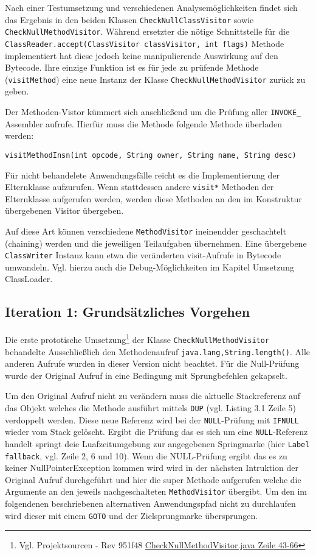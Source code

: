 Nach einer Testumsetzung und verschiedenen Analysemöglichkeiten findet sich
das Ergebnis in den beiden Klassen \texttt{CheckNullClassVisitor} sowie
\texttt{CheckNullMethodVisitor}. Während ersetzter die nötige Schnittstelle für die
\texttt{ClassReader.accept(ClassVisitor classVisitor, int flags)} Methode implementiert
hat diese jedoch keine manipulierende Auswirkung auf den Bytecode. Ihre
einzige Funktion ist es für jede zu prüfende Methode (\texttt{visitMethod})
eine neue Instanz der Klasse \texttt{CheckNullMethodVisitor} zurück zu geben.

Der Methoden-Vistor kümmert sich anschließend um die Prüfung aller \texttt{INVOKE\_\*}
Assembler aufrufe. Hierfür muss die Methode folgende Methode überladen werden:

\texttt{visitMethodInsn(int opcode, String owner, String name, String desc)}

Für nicht behandelete Anwendungsfälle reicht es die Implementierung der Elternklasse
aufzurufen. Wenn stattdessen andere \texttt{visit*} Methoden der Elternklasse aufgerufen
werden, werden diese Methoden an den im Konstruktur übergebenen Visitor übergeben.

Auf diese Art können verschiedene \texttt{MethodVisitor} ineinendder geschachtelt
(chaining) werden und die jeweiligen Teilaufgaben übernehmen. Eine übergebene \texttt{ClassWriter}
Instanz kann etwa die veränderten visit-Aufrufe in Bytecode umwandeln. Vgl. hierzu
auch die Debug-Möglichkeiten im Kapitel Umsetzung ClassLoader.

\subsection{Iteration 1: Grundsätzliches Vorgehen}

Die erste prototische Umsetzung\footnote{Vgl. Projektsourcen - Rev 951f48 \href{https://github.com/jerolimov/java-hardener/blob/951f48194f53baebd0915c01e0ed3cc2596bd0db/src/main/java/de/fhkoeln/gm/cui/javahardener/CheckNullMethodVisitor.java\#L43-66}{CheckNullMethodVisitor.java Zeile 43-66}} der Klasse \texttt{CheckNullMethodVisitor} behandelte Ausschließlich
den Methodenaufruf \texttt{java.lang,String.length()}. Alle anderen Aufrufe wurden
in dieser Version nicht beachtet. Für die Null-Prüfung wurde der Original Aufruf
in eine Bedingung mit Sprungbefehlen gekapselt.

Um den Original Aufruf nicht zu verändern muss die aktuelle Stackreferenz
auf das Objekt welches die Methode ausführt mittels \texttt{DUP} (vgl. Listing 3.1 Zeile 5)
verdoppelt werden. Diese neue Referenz wird bei der \texttt{NULL}-Prüfung mit
\texttt{IFNULL} wieder vom Stack gelöscht. Ergibt die Prüfung das es sich um
eine \texttt{NULL}-Referenz handelt springt deie Luafzeitumgebung zur
angegebenen Springmarke (hier \texttt{Label fallback}, vgl. Zeile 2, 6 und 10).
Wenn die NULL-Prüfung ergibt das es zu keiner NullPointerException kommen
wird wird in der nächsten Intruktion der Original Aufruf durchgeführt
und hier die super Methode aufgerufen welche die Argumente an den jeweils
nachgeschalteten \texttt{MethodVisitor} übergibt.
Um den im folgendenen beschriebenen alternativen Anwendungspfad nicht
zu durchlaufen wird dieser mit einem \texttt{GOTO} und der Zielsprungmarke
übersprungen.


